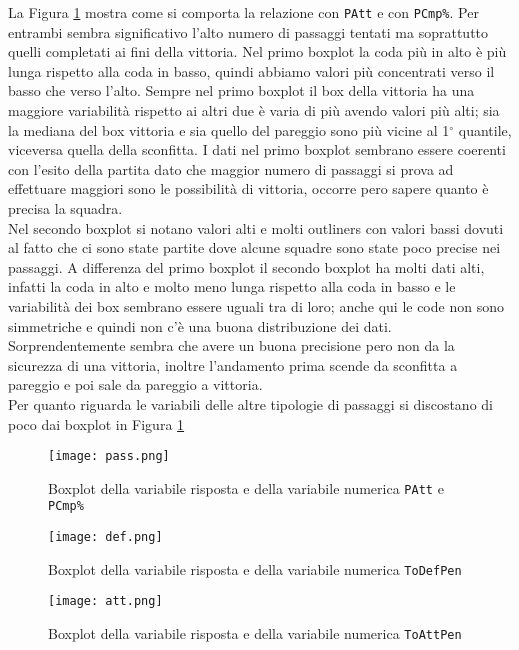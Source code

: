 La Figura \ref{fig:pass} mostra come si comporta la relazione con \texttt{PAtt} e con \texttt{PCmp\%}. Per entrambi sembra significativo l'alto numero di passaggi tentati ma soprattutto quelli completati ai fini della vittoria. Nel primo boxplot la coda più in alto è più lunga rispetto alla coda in basso, quindi abbiamo valori più concentrati verso il basso che verso l'alto. Sempre nel primo boxplot il box della vittoria ha una maggiore variabilità rispetto ai altri due è varia di più avendo valori più alti; sia la mediana del box vittoria e sia quello del pareggio sono più vicine al 1${^\circ}$ quantile, viceversa quella della sconfitta. I dati nel primo boxplot sembrano essere coerenti con l'esito della partita dato che maggior numero di passaggi si prova ad effettuare maggiori sono le possibilità di vittoria, occorre pero sapere quanto è precisa la squadra.\\
Nel secondo boxplot si notano valori alti e molti outliners con valori bassi dovuti al fatto che ci sono state partite dove alcune squadre sono state poco precise nei passaggi. A differenza del primo boxplot il secondo boxplot ha molti dati alti, infatti la coda in alto e molto meno lunga rispetto alla coda in basso e le variabilità dei box sembrano essere uguali tra di loro; anche qui le code non sono simmetriche e quindi non c'è una buona distribuzione dei dati. Sorprendentemente sembra che avere un buona precisione pero non da la sicurezza di una vittoria, inoltre l'andamento prima scende da sconfitta a pareggio e poi sale da pareggio a vittoria.\\
Per quanto riguarda le variabili delle altre tipologie di passaggi si discostano di poco dai boxplot in Figura \ref{fig:pass}

\begin{figure}[htbp]
	\begin{center}
		\texttt{[image: pass.png]}
		\caption{Boxplot della variabile risposta e della variabile numerica \texttt{PAtt} e \texttt{PCmp\%}  } \label{fig:pass}
	\end{center}
\end{figure}

\begin{figure}[htbp]
	\begin{center}
		\texttt{[image: def.png]}
		\caption{Boxplot della variabile risposta e della variabile numerica \texttt{ToDefPen} } \label{fig:def}
	\end{center}
\end{figure}

\begin{figure}[htbp]
	\begin{center}
		\texttt{[image: att.png]}
		\caption{Boxplot della variabile risposta e della variabile numerica \texttt{ToAttPen} } \label{fig:att}
	\end{center}
\end{figure}